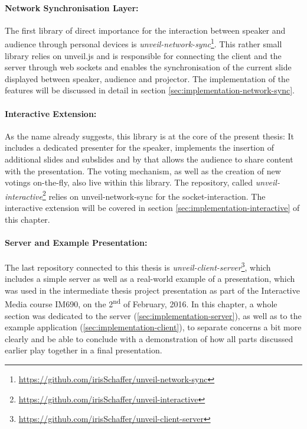 \paragraph{Network Synchronisation Layer:} The first library of direct importance for the interaction between speaker and audience through personal devices is \textit{unveil-network-sync}\footnote{\url{https://github.com/irisSchaffer/unveil-network-sync}}. This rather small library relies on unveil.js and is responsible for connecting the client and the server through web sockets and enables the synchronisation of the current slide displayed between speaker, audience and projector. The implementation of the features will be discussed in detail in section \ref{sec:implementation-network-sync}.

\paragraph{Interactive Extension:} As the name already suggests, this library is at the core of the present thesis: It includes a dedicated presenter for the speaker, implements the insertion of additional slides and subslides and by that allows the audience to share content with the presentation. The voting mechanism, as well as the creation of new votings on-the-fly, also live within this library. The repository, called \emph{unveil-interactive}\footnote{\url{https://github.com/irisSchaffer/unveil-interactive}} relies on unveil-network-sync for the socket-interaction. The interactive extension will be covered in section \ref{sec:implementation-interactive} of this chapter.

\paragraph{Server and Example Presentation:} The last repository connected to this thesis is \emph{unveil-client-server}\footnote{\url{https://github.com/irisSchaffer/unveil-client-server}}, which includes a simple server as well as a real-world example of a presentation, which was used in the intermediate thesis project presentation as part of the Interactive Media course IM690, on the 2\textsuperscript{nd}\xspace of February, 2016. In this chapter, a whole section was dedicated to the server (\ref{sec:implementation-server}), as well as to the example application (\ref{sec:implementation-client}), to separate concerns a bit more clearly and be able to conclude with a demonstration of how all parts discussed earlier play together in a final presentation.

